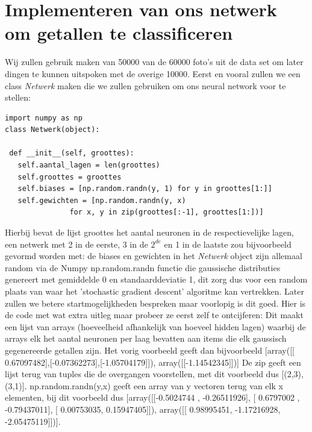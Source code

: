 \documentclass[10pt,a4paper,twoside]{article}
\begin{document}
\section{Implementeren van ons netwerk om getallen te classificeren}
Wij zullen gebruik maken van 50000 van de 60000 foto's uit de data set om later dingen te kunnen uitspoken met de overige 10000.
Eerst en vooral zullen we een class \textit{Netwerk} maken die we zullen gebruiken om ons neural network voor te stellen:
\begin{verbatim}
import numpy as np
class Netwerk(object):
	
 def __init__(self, groottes):
   self.aantal_lagen = len(groottes)
   self.groottes = groottes
   self.biases = [np.random.randn(y, 1) for y in groottes[1:]]
   self.gewichten = [np.random.randn(y, x)
               for x, y in zip(groottes[:-1], groottes[1:])]
\end{verbatim}
Hierbij bevat de lijst groottes het aantal neuronen in de respectievelijke lagen, een netwerk met 2 in de eerste, 3 in de $2^{de}$ en 1 in de laatste zou bijvoorbeeld gevormd worden met: 
de biases en gewichten in het \textit{Netwerk} object zijn allemaal random via de Numpy np.random.randn functie die gaussische distributies genereert met gemiddelde 0 en standaarddeviatie 1, dit zorg dus voor een random plaats van waar het 'stochastic gradient descent' algoritme kan vertrekken. Later zullen we betere startmogelijkheden bespreken maar voorlopig is dit goed.
Hier is de code met wat extra uitleg maar probeer ze eerst zelf te ontcijferen:
\newpage
{}
\vspace{0.2cm}
Dit maakt een lijst van arrays (hoeveelheid afhankelijk van hoeveel hidden lagen) waarbij
de arrays elk het aantal neuronen per laag bevatten aan items die elk gaussisch gegenereerde getallen
zijn. Het vorig voorbeeld geeft dan bijvoorbeeld [array([[ 0.67097482],[-0.07362273],[-1.05704179]]),
array([[-1.14542345]])]
\vspace{0.2cm}
De zip geeft een lijst terug van tuples die de overgangen voorstellen, met dit voorbeeld dus [(2,3),(3,1)].
np.random.randn(y,x) geeft een array van y vectoren terug van elk x elementen, bij dit voorbeeld dus
[array([[-0.5024744 , -0.26511926],
[ 0.6797002 , -0.79437011],
[ 0.00753035,  0.15947405]]),
array([[ 0.98995451, -1.17216928, -2.05475119]])].\\
\end{document}
